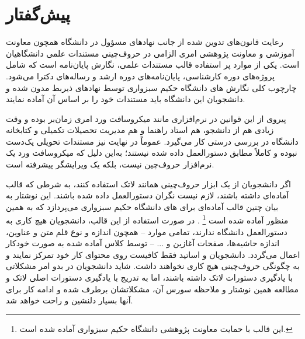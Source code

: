 \chapter*{پیش‌گفتار}

رعایت قانون‌های تدوین شده از جانب نهادهای مسؤول در دانشگاه همچون معاونت آموزشی و معاونت پژوهشی امری الزامی در حروف‌چینی مستندات علمی دانشگاهیان است. یکی از موارد پر استفاده قالب مستندات علمی، نگارش پایان‌نامه است که شامل پروژه‌های دوره کارشناسی، پایان‌نامه‌های دوره ارشد و رساله‌های دکترا می‌شود.
چارچوب کلی  نگارش \پ های دانشگاه حکیم سبزواری توسط نهادهای ذیربط مدون شده و دانشجویان این دانشگاه باید مستندات خود را بر اساس آن آماده نمایند.

پیروی از این قوانین در نرم‌افزاری مانند میکروسافت ورد
  امری زمان‌بر بوده و وقت زیادی هم از دانشجو، هم استاد راهنما و هم مدیریت تحصیلات تکمیلی و کتابخانه دانشگاه در بررسی درستی کار می‌گیرد. عموماً در نهایت نیز مستندات تحویلی یک‌دست نبوده و کاملاً مطابق دستورالعمل داده شده نیستند؛ به‌این دلیل که میکروسافت ورد یک نرم‌افزار حروف‌چین نیست، بلکه یک ویرایشگر پیشرفته است.

اگر دانشجویان از یک ابزار حروف‌چینی همانند لاتک 
\lr{(\LaTeX)}
استفاده کنند، به شرطی که قالب آماده‌ای داشته باشند، لازم نیست نگران دستورالعمل داده شده باشند.
این نوشتار به بیان چنین قالب آماده‌ای برای \پ های دانشگاه حکیم سبزواری می‌پردازد که به همین منظور آماده شده است
\footnote{این قالب با حمایت معاونت پژوهشی دانشگاه حکیم سبزواری آماده شده است.}
.
در صورت استفاده از این قالب، دانشجویان هیچ کاری به دستورالعمل دانشگاه ندارند، تمامی موارد -- همچون اندازه و نوع  قلم متن و عناوین، اندازه حاشیه‌ها، صفحات آغازین و ... -- توسط کلاس آماده شده به صورت خودکار اعمال می‌گردد. دانشجویان و اساتید فقط کافیست روی محتوای کار خود تمرکز نمایند و به چگونگی حروف‌چینی هیچ کاری نخواهند داشت.
شاید دانشجویان در بدو امر مشکلاتی با یادگیری دستورات لاتک داشته باشند، اما به تدریج با یادگیری دستورات اصلی لاتک و مطالعه همین نوشتار و ملاحظه سورس آن، مشکلاتشان برطرف شده و ادامه کار برای آنها بسیار دلنشین و راحت خواهد شد.
